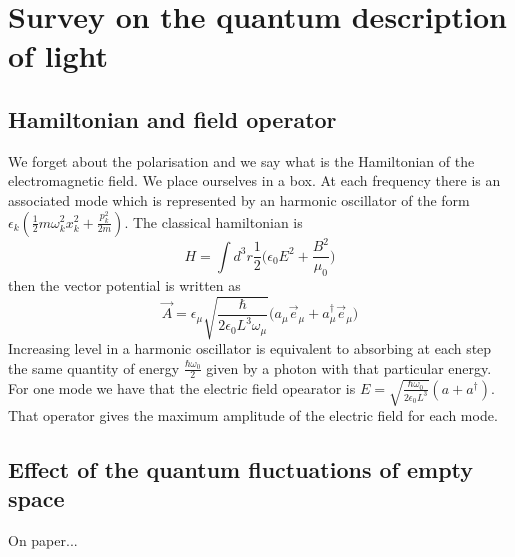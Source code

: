 \documentclass[10pt,a4paper]{book}
\begin{document}
\chapter{Survey on the quantum description of light}
\section{Hamiltonian and field operator}
We forget about the polarisation and we say what is the Hamiltonian of the electromagnetic field. We place ourselves in a box. At each frequency there is an associated mode which is represented by an harmonic oscillator of the form $\epsilon_k(\frac{1}{2}m\omega_k^2x_k^2+\frac{p_k^2}{2m})$. The classical hamiltonian is
$$H=\int d^3r \frac{1}{2}\bigg(\epsilon_0E^2+\frac{B^2}{\mu_0}\bigg)$$
then the vector potential is written as 
$$\vec{A}=\epsilon_{\mu}\sqrt{\frac{\hbar}{2\epsilon_0L^3\omega_{\mu}}}\bigg(a_{\mu}\vec{e}_{\mu}+a^{\dagger}_{\mu}\vec{e}_{\mu}\bigg)$$
Increasing level in a harmonic oscillator is equivalent to absorbing at each step the same quantity of energy $\frac{\hbar\omega_0}{2}$ given by a photon with that particular energy. For one mode we have that the electric field opearator is $E=\sqrt{\frac{\hbar\omega_0}{2\epsilon_0L^3}}(a+a^{\dagger})$. That operator gives the maximum amplitude of the electric field for each mode.


\section{Effect of the quantum fluctuations of empty space}
On paper...
\end{document}
